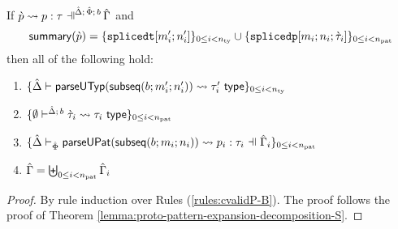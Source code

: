 \begin{lemma}
\label{lemma:proto-pattern-expansion-decomposition-B}
If $\cvalidP{\upctx}{\pscene{\uDelta}{\uPhi}{b}}{\cpv}{p}{\tau}$ and 
\[ 
\mathsf{summary}(\grave{p}) = \{\texttt{splicedt}[m'_i; n'_i]\}_{0 \leq i < n_\text{ty}} \cup \{\texttt{splicedp}[m_i; n_i; \grave{\tau}_i]\}_{0 \leq i < n_\text{pat}}
\]
then all of the following hold:
\begin{enumerate}
    \item $\{
          \hat{\Delta} \vdash 
            \mathsf{parseUTyp}(\mathsf{subseq}(b; m'_i; n'_i))
           \leadsto \tau'_i~\mathsf{type}
        \}_{0 \leq i < n_\text{ty}}$
    \item $\{
      \emptyset\vdash^{
        \hat{\Delta};\,b
      } 
        \grave{\tau}_i
       \leadsto \tau_i~\mathsf{type}
    \}_{0 \leq i < n_\text{pat}}$
    \item $\sseq{
      \patExpands
        {\upctx_i}
        {\uPhi}
        {\parseUPatF{\bsubseq{b}{m_i}{n_i}}}
        {p_i}
        {\tau_i}
    }{\npat}$
  \item $\hat\Gamma = \biguplus_{0 \leq i < n_\text{pat}} \hat\Gamma_i$
\end{enumerate}
\end{lemma}
\begin{proof} By rule induction over Rules (\ref{rules:cvalidP-B}). The proof follows the proof of Theorem \ref{lemma:proto-pattern-expansion-decomposition-S}.
\end{proof}

